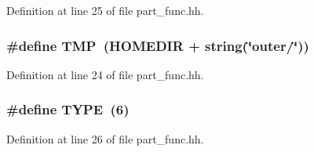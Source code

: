 Definition at line 25 of file part\+\_\+func.\+hh.

\hypertarget{part__func_8hh_a589ba3dc5e20290a35fb1e626372ef61}{
\subsubsection[{T\+M\+P}]{\setlength{\rightskip}{0pt plus 5cm}\#define T\+M\+P~({\bf H\+O\+M\+E\+D\+I\+R} + string(\char`\"{}outer/\char`\"{}))}}\label{part__func_8hh_a589ba3dc5e20290a35fb1e626372ef61}


Definition at line 24 of file part\+\_\+func.\+hh.

\hypertarget{part__func_8hh_a5a392548f2df67370cb15d2a5d75cd7b}{
\subsubsection[{T\+Y\+P\+E}]{\setlength{\rightskip}{0pt plus 5cm}\#define T\+Y\+P\+E~(6)}}\label{part__func_8hh_a5a392548f2df67370cb15d2a5d75cd7b}


Definition at line 26 of file part\+\_\+func.\+hh.

